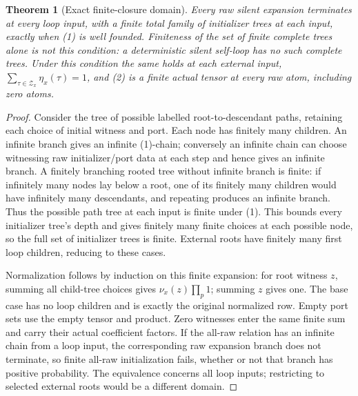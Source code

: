 \documentclass[11pt]{article}
\newtheorem{theorem}{Theorem}\newtheorem{definition}{Definition}
\begin{document}
\begin{theorem}[Exact finite-closure domain]
Every raw silent expansion terminates at every loop input, with a finite total family of initializer trees at each input, exactly when (1) is well founded. Finiteness of the set of finite complete trees alone is not this condition: a deterministic silent self-loop has no such complete trees. Under this condition the same holds at each external input, $\sum_{\tau\in\mathcal Z_x}\eta_x(\tau)=1$, and (2) is a finite actual tensor at every raw atom, including zero atoms.
\end{theorem}
\begin{proof}
Consider the tree of possible labelled root-to-descendant paths, retaining each choice of initial witness and port. Each node has finitely many children. An infinite branch gives an infinite (1)-chain; conversely an infinite chain can choose witnessing raw initializer/port data at each step and hence gives an infinite branch. A finitely branching rooted tree without infinite branch is finite: if infinitely many nodes lay below a root, one of its finitely many children would have infinitely many descendants, and repeating produces an infinite branch. Thus the possible path tree at each input is finite under (1). This bounds every initializer tree's depth and gives finitely many finite choices at each possible node, so the full set of initializer trees is finite. External roots have finitely many first loop children, reducing to these cases.

Normalization follows by induction on this finite expansion: for root witness $z$, summing all child-tree choices gives $\nu_x(z)\prod_p1$; summing $z$ gives one. The base case has no loop children and is exactly the original normalized row. Empty port sets use the empty tensor and product. Zero witnesses enter the same finite sum and carry their actual coefficient factors. If the all-raw relation has an infinite chain from a loop input, the corresponding raw expansion branch does not terminate, so finite all-raw initialization fails, whether or not that branch has positive probability. The equivalence concerns all loop inputs; restricting to selected external roots would be a different domain.
\end{proof}
\end{document}
